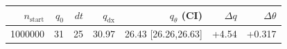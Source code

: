 \begin{tabular}{r r r r r r r}
\hline
$n_{\mathrm{start}}$ & $q_0$ & $dt$ & $q_{\mathrm{dx}}$ & $q_{\theta}$ (CI) & $\Delta q$ & $\Delta\theta$ \\
\hline
1000000 & 31 & 25 & 30.97 & 26.43 [26.26,26.63] & +4.54 & +0.317 \\
\hline
\end{tabular}
